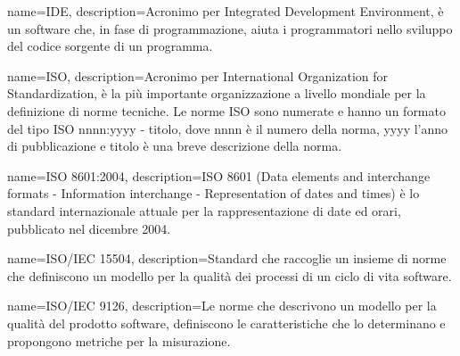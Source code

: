 {
	name=IDE,
	description={Acronimo per Integrated Development Environment, è un software che, in fase di programmazione, aiuta i programmatori nello sviluppo del codice sorgente di un programma.}
}

{
	name=ISO,
	description={Acronimo per International Organization for Standardization, è la più importante organizzazione a livello mondiale per la definizione di norme tecniche. Le norme ISO sono numerate e hanno un formato del tipo ISO nnnn:yyyy - titolo, dove nnnn è il numero della norma, yyyy l'anno di pubblicazione e titolo è una breve descrizione della norma.}
}

{
	name=ISO 8601:2004,
	description={ISO 8601 (Data elements and interchange formats - Information interchange - Representation of dates and times) è lo standard internazionale attuale per la rappresentazione di date ed orari, pubblicato nel dicembre 2004.}
}

{
	name=ISO/IEC 15504,
	description={Standard che raccoglie un insieme di norme che definiscono un modello per la qualità dei processi di un ciclo di vita software.}
}

{
	name=ISO/IEC 9126,
	description={Le norme che descrivono un modello per la qualità del prodotto software, definiscono le caratteristiche che lo determinano e propongono metriche per la misurazione.}
}